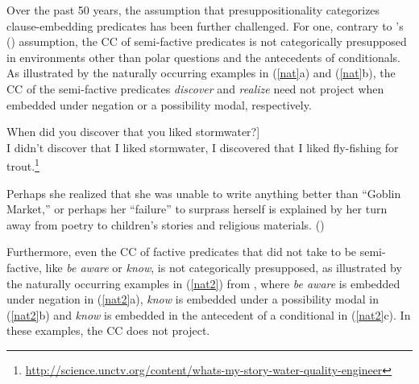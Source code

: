 \documentclass[11pt,fleqn]{article}
\newcommand{\6}{\mbox{$[\hspace*{-.6mm}[$}}
\newcommand{\9}{\mbox{$]\hspace*{-.6mm}]$}}
\newcommand{\citetpos}[1]{\citeauthor{#1}'s (\citeyear{#1})}
\begin{document}
Over the past 50 years, the assumption that presuppositionality categorizes clause-embedding predicates has been further challenged. For one, contrary to \citetpos{karttunen71b} assumption, the CC of semi-factive predicates is not categorically presupposed in environments other than polar questions and the antecedents of conditionals. As illustrated by the naturally occurring examples in (\ref{nat}a) and (\ref{nat}b), the CC of the semi-factive predicates {\em discover} and {\em realize} need not project when embedded under negation or a possibility modal, respectively.

\begin{exe}
\ex\label{nat} 
\begin{xlist}

\ex {[}When did you discover that you liked stormwater?] \\ I didn't discover that I liked stormwater, I discovered that I liked fly-fishing for trout.\footnote{\url{http://science.unctv.org/content/whats-my-story-water-quality-engineer}}

\ex Perhaps she realized that she was unable to write anything better than ``Goblin Market,'' or perhaps her ``failure'' to surprass herself is explained by her turn away from poetry to children's stories and religious materials. \hfill (\citealt[87]{beaver-belly})

\end{xlist}

\end{exe}

Furthermore, even the CC of factive predicates that \citet{karttunen71b} did not take to be semi-factive, like {\em be aware} or {\em know}, is not categorically presupposed, as illustrated by the naturally occurring examples in (\ref{nat2}) from \citealt{beaver-belly}, where {\em be aware} is embedded under negation in (\ref{nat2}a), {\em know} is embedded under a possibility modal in (\ref{nat2}b) and {\em know} is embedded in the antecedent of a conditional in (\ref{nat2}c). In these examples, the CC does not project.
\end{document}
